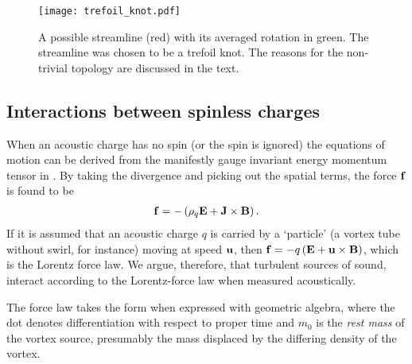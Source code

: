 \begin{figure}[h]
 \centering
 \texttt{[image: trefoil\_knot.pdf]}
 \caption{
   A possible streamline (red) with its averaged rotation in green.
   The streamline was chosen to be a trefoil knot. The reasons for the non-trivial topology are discussed in the text.
   }
   \label{fig:particle}
\end{figure}

\subsection{Interactions between spinless charges}\label{sec:spinless}
When an acoustic charge has no spin (or the spin is ignored)
the equations of motion can be derived from the manifestly gauge invariant energy momentum tensor in  .
By taking the  divergence and picking out the spatial terms,
the force $\mathbf{f}$ is found to be \cite{Doran2003}
\begin{align}
  \mathbf{f} = - \left( \rho_q\mathbf{E} + \mathbf{J} \times \mathbf{B} \right).
\end{align}
If it is assumed that an acoustic charge $q$ is carried by a `particle' (a vortex tube without swirl, for instance)
moving at speed $\textbf{u}$, then
$\mathbf{f} = - q\left( \mathbf{E} + \textbf{u} \times \mathbf{B} \right)$, which is the Lorentz force law.
We argue, therefore, that turbulent sources of sound, interact according to the Lorentz-force law when measured acoustically.

The force law takes the form
when expressed with geometric algebra, where the dot denotes differentiation 
with respect to proper time and $m_0$ is the {\em rest mass} of the vortex source,
presumably the mass  displaced by the differing density of the vortex.


